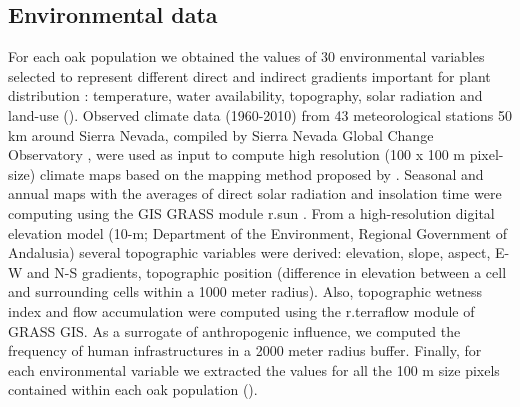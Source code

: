 \subsection{Environmental data}\label{sec:multivar:EnvData}
For each oak population we obtained the values of 30 environmental variables selected to represent different direct and indirect gradients important for plant distribution \autocite{GuisanZimmermann2000PredictiveHabitat,Williamsetal2012WhichEnvironmental}: temperature, water availability, topography, solar radiation and land-use (). Observed climate data (1960-2010) from 43 meteorological stations 50 km around Sierra Nevada, compiled by Sierra Nevada Global Change Observatory \autocite{Zamoraetal2017GlobalChange}, were used as input to compute high resolution (100 x 100 m pixel-size) climate maps \autocite{Benitoetal2014ClimateSimulations} based on the mapping method proposed by \textcite{Ninyerolaetal2000MethodologicalApproach}. Seasonal and annual maps with the averages of direct solar radiation and insolation time were computing using the GIS GRASS module r.sun \autocite{Neteleretal2012GRASSGIS,SuriHofierka2004NewGISbased}. From a high-resolution digital elevation model (10-m; Department of the Environment, Regional Government of Andalusia) several topographic variables were derived: elevation, slope, aspect, E-W and N-S gradients, topographic position (difference in elevation between a cell and surrounding cells within a 1000 meter radius)\autocite{Guisanetal1999GLMCCA}. Also, topographic wetness index and flow accumulation were computed using the r.terraflow module of GRASS GIS. As a surrogate of anthropogenic influence, we computed the frequency of human infrastructures in a 2000 meter radius buffer. Finally, for each environmental variable we extracted the values for all the 100 m size pixels contained within each oak population ().

